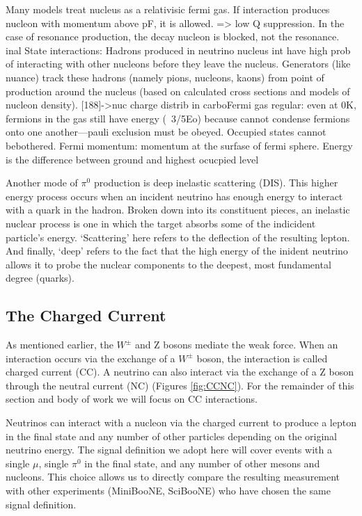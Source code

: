 \documentclass[12pt]{article}
\begin{document}
  
Many models treat nucleus as a relativisic fermi gas. If interaction produces nucleon with momentum above pF, it is allowed.  => low Q suppression. In the case of resonance production, the decay nucleon is blocked, not the resonance. inal State interactions: Hadrons produced in neutrino nucleus int have high prob of interacting with other nucleons before they leave the nucleus. Generators (like nuance) track these hadrons (namely pions, nucleons, kaons) from point of production around the nucleus (based on calculated cross sections and models of nucleon density).  [188]->nuc charge distrib in carboFermi gas regular: even at 0K, fermions in the gas still have energy (~3/5Eo) because cannot condense fermions onto one another—pauli exclusion must be obeyed. Occupied states cannot bebothered. Fermi momentum: momentum at the surfase of fermi sphere. Energy is the difference between ground and highest ocucpied level


\noindent  Another mode of $\pi^0$ production is deep inelastic scattering (DIS). This higher energy process occurs when an incident neutrino has enough energy to interact with a quark in the hadron. Broken down into its constituent pieces, an inelastic nuclear process is one in which the target absorbs some of the indicident particle's energy.  `Scattering' here refers to the deflection of the resulting lepton.  And finally, `deep' refers to the fact that the high energy of the inident neutrino allows it to probe the nuclear components to the deepest, most fundamental degree (quarks).
\noindent


\subsection{The Charged Current}
As mentioned earlier, the $W^\pm$ and Z bosons mediate the weak force. When an interaction occurs via the exchange of a $W^\pm$ boson, the interaction is called charged current (CC).  A neutrino can also interact via the exchange of a Z boson through the neutral current (NC) (Figures \ref{fig:CCNC}). For the remainder of this section and body of work we will focus on CC interactions. 

Neutrinos can interact with a nucleon via the charged current to produce a lepton in the final state and any number of other particles depending on the original neutrino energy. The signal definition we adopt here will cover events with a single $\mu$, single $\pi^0$ in the final state, and any number of other mesons and nucleons. This choice allows us to directly compare the resulting measurement with other experiments (MiniBooNE, SciBooNE) who have chosen the same signal definition.
\end{document}
